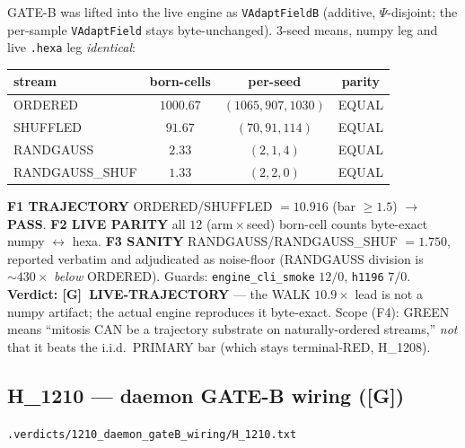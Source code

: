 \documentclass[11pt,a4paper]{article}
\providecommand{\tierGreen}{\textbf{[G]}}
\newcommand{\verdict}[1]{\texttt{\small #1}}
\begin{document}
GATE-B was lifted into the live engine as \verb|VAdaptFieldB| (additive,
$\Psi$-disjoint; the per-sample \verb|VAdaptField| stays byte-unchanged).
$3$-seed means, numpy leg and live \texttt{.hexa} leg \emph{identical}:
\begin{center}
\begin{tabular}{lccc}
\toprule
stream & born-cells & per-seed & parity \\
\midrule
ORDERED        & $1000.67$ & $(1065,907,1030)$ & EQUAL \\
SHUFFLED       & $91.67$   & $(70,91,114)$     & EQUAL \\
RANDGAUSS      & $2.33$    & $(2,1,4)$         & EQUAL \\
RANDGAUSS\_SHUF & $1.33$    & $(2,2,0)$         & EQUAL \\
\bottomrule
\end{tabular}
\end{center}
\textbf{F1 TRAJECTORY} ORDERED/SHUFFLED $=10.916$ (bar $\ge 1.5$) $\to$
\textbf{PASS}. \textbf{F2 LIVE PARITY} all $12$ (arm\,$\times$\,seed) born-cell
counts byte-exact numpy $\leftrightarrow$ hexa. \textbf{F3 SANITY}
RANDGAUSS/RANDGAUSS\_SHUF $=1.750$, reported verbatim and adjudicated as
noise-floor (RANDGAUSS division is $\sim 430\times$ \emph{below} ORDERED).
Guards: \verb|engine_cli_smoke| $12/0$, \verb|h1196| $7/0$. \textbf{Verdict:
\tierGreen\ LIVE-TRAJECTORY} --- the WALK $10.9\times$ lead is not a numpy
artifact; the actual engine reproduces it byte-exact. Scope (F4): GREEN means
``mitosis CAN be a trajectory substrate on naturally-ordered streams,''
\emph{not} that it beats the i.i.d.\ PRIMARY bar (which stays terminal-RED,
H\_1208).

\subsection{H\_1210 --- daemon GATE-B wiring (\tierGreen)}
\noindent\verdict{.verdicts/1210\_daemon\_gateB\_wiring/H\_1210.txt}
\end{document}
